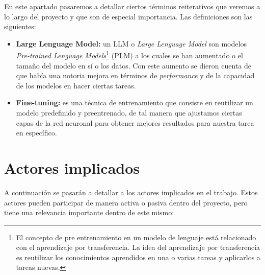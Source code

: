 
En este apartado pasaremos a detallar ciertos términos reiterativos que veremos a lo largo del proyecto y que son de especial importancia. Las definiciones son las siguientes:

\begin{itemize}
    \item \textbf{Large Lenguage Model:} un LLM o \textit{Large Lenguage Model} son modelos \textit{Pre-trained Lenguage Models}\footnote{El concepto de pre entrenamiento en un modelo
                                        de lenguaje está relacionado con el aprendizaje por transferencia. La idea del aprendizaje por transferencia es reutilizar los conocimientos
                                        aprendidos en una o varias tareas y aplicarlos a tareas nuevas.} (PLM) a los cuales se han aumentado o el tamaño del modelo en sí o los datos.
                                        Con este aumento se dieron cuenta de que había una notoria mejora en términos de \textit{performance} y de la capacidad de los modelos en hacer
                                        ciertas tareas. \cite{ZhaoWayneXin2023ASoL}
    \item \textbf{Fine-tuning:} es una técnica de entrenamiento que consiste en reutilizar un modelo predefinido y preentrenado, de tal manera que ajustamos ciertas capas de la
                                red neuronal para obtener mejores resultados para nuestra tarea en específico.
\end{itemize}

\section{Actores implicados}
\label{sec:actores}


A continuación se pasarán a detallar a los actores implicados en el trabajo. Estos actores pueden participar de manera activa o pasiva dentro del proyecto, pero tiene una relevancia
importante dentro de este mismo:


